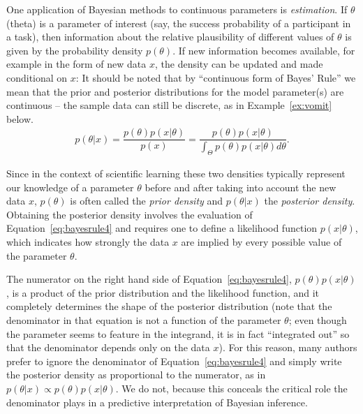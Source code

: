  One application of Bayesian methods to continuous parameters is \emph{estimation}.  If $\theta$ (theta) is a parameter of interest (say, the success probability of a participant in a task), then information about the relative plausibility of different values of $\theta$ is given by the probability density $p(\theta)$. If new information becomes available, for example in the form of new data $x$, the density can be %
 updated and %
 made conditional on $x$: It should be noted that by ``continuous form of Bayes' Rule'' we mean that the prior and posterior distributions for the model parameter(s) are continuous -- the sample data can still be discrete, as in Example~{\ref{ex:vomit}} below.
 \begin{equation}
\begin{array}{rcl}
p(\theta|x) = \dfrac{p(\theta)p(x|\theta)}{p(x)} = \dfrac{p(\theta)p(x|\theta)}{\int_\Theta p(\theta)p(x|\theta)d\theta} .
\end{array}
\label{eq:bayesrule4}
\end{equation}

Since in the context of scientific learning these two densities typically represent our knowledge of a parameter $\theta$ before and after taking into account the new data $x$, $p(\theta)$ is often called the \emph{prior density} and $p(\theta|x)$ the \emph{posterior density}.  Obtaining the posterior density involves the evaluation of Equation~\ref{eq:bayesrule4} and requires one to define a likelihood function $p(x|\theta)$, which indicates how strongly the data $x$ are implied by every possible value of the parameter $\theta$. 

The numerator on the right hand side of Equation~\ref{eq:bayesrule4}, $p(\theta)p(x|\theta)$,  is a product of the prior distribution and the likelihood function, and it completely determines the shape of the posterior distribution (note that the denominator in that equation is not a function of the parameter $\theta$; even though the parameter seems to feature in the integrand, it is in fact ``integrated out'' so that the denominator depends only on the data $x$). For this reason, many authors prefer to ignore the denominator of Equation~\ref{eq:bayesrule4} and simply write the posterior density as proportional to the numerator, as in $p(\theta|x)\propto p(\theta)p(x|\theta)$. We do not, because this conceals the critical role the denominator plays in a predictive interpretation of Bayesian inference.

